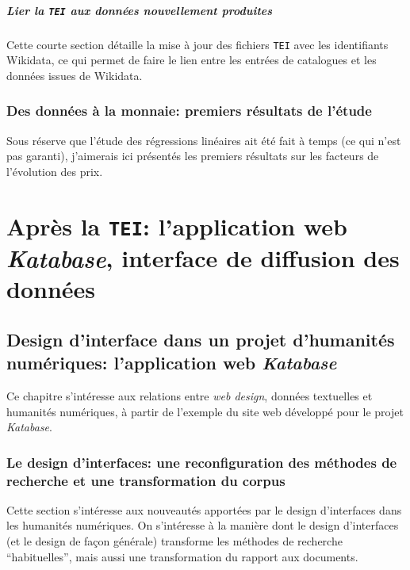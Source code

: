 \documentclass[a4paper, 12pt, twoside]{book}
\newcommand{\ktb}{\textit{Katabase}}
\newcommand{\tei}{\texttt{TEI}}
\begin{document}
\subsubsection{Lier la \tei{} aux données nouvellement produites}
Cette courte section détaille la mise à jour des fichiers \tei{} avec les identifiants Wikidata, ce qui permet de faire le lien entre les entrées de catalogues et les données issues de Wikidata.

\section{Des données à la monnaie: premiers résultats de l'étude}
Sous réserve que l'étude des régressions linéaires ait été fait à temps (ce qui n'est pas garanti), j'aimerais ici présentés les premiers résultats sur les facteurs de l'évolution des prix.


\part{Après la \tei{}: l'application web \ktb{}, interface de diffusion des données}
\chapter{Design d'interface dans un projet d'humanités numériques: l'application web \ktb{}}
Ce chapitre s'intéresse aux relations entre \textit{web design}, données textuelles et humanités numériques, à partir de l'exemple du site web développé pour le projet \ktb{}.

\section{Le design d'interfaces: une reconfiguration des méthodes de recherche et une transformation du corpus}
Cette section s'intéresse aux nouveautés apportées par le design d'interfaces dans les humanités numériques. On s'intéresse à la manière dont le design d'interfaces (et le design de façon générale) transforme les méthodes de recherche \enquote{habituelles}, mais aussi une transformation du rapport aux documents.
\end{document}
